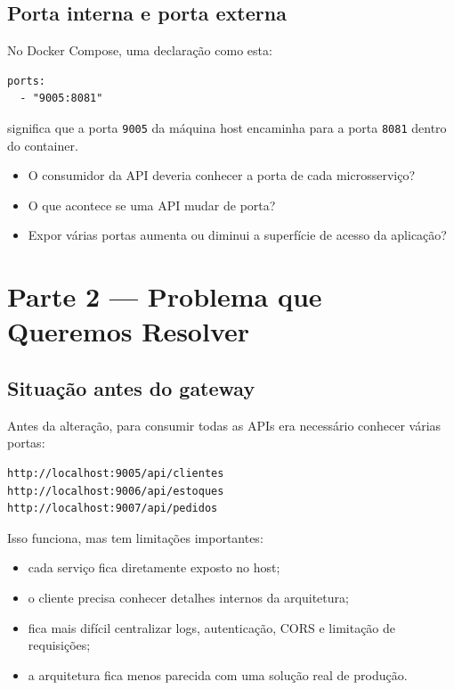 \documentclass[12pt,a4paper]{article}
\begin{document}
\subsection{Porta interna e porta externa}

No Docker Compose, uma declara\c{c}\~ao como esta:

\begin{lstlisting}[style=code]
ports:
  - "9005:8081"
\end{lstlisting}

significa que a porta \texttt{9005} da m\'aquina host encaminha para a porta \texttt{8081} dentro do container.


\begin{questbox}
  \begin{itemize}[leftmargin=1.5em]
    \item O consumidor da API deveria conhecer a porta de cada microsservi\c{c}o?
    \item O que acontece se uma API mudar de porta?
    \item Expor v\'arias portas aumenta ou diminui a superf\'icie de acesso da aplica\c{c}\~ao?
  \end{itemize}
\end{questbox}

\section{Parte 2 --- Problema que Queremos Resolver}

\subsection{Situa\c{c}\~ao antes do gateway}

Antes da altera\c{c}\~ao, para consumir todas as APIs era necess\'ario conhecer v\'arias portas:

\begin{lstlisting}[style=terminal]
http://localhost:9005/api/clientes
http://localhost:9006/api/estoques
http://localhost:9007/api/pedidos
\end{lstlisting}

Isso funciona, mas tem limita\c{c}\~oes importantes:

\begin{itemize}[leftmargin=1.5em]
  \item cada servi\c{c}o fica diretamente exposto no host;
  \item o cliente precisa conhecer detalhes internos da arquitetura;
  \item fica mais dif\'icil centralizar logs, autentica\c{c}\~ao, CORS e limita\c{c}\~ao de requisi\c{c}\~oes;
  \item a arquitetura fica menos parecida com uma solu\c{c}\~ao real de produ\c{c}\~ao.
\end{itemize}
\end{document}
